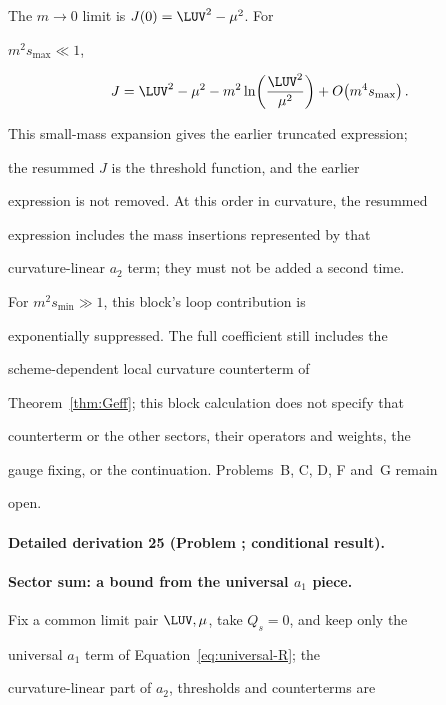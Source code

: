 The \(m\to0\) limit is \(J(0)=\LUV^2-\mu^2\). For

\(m^2s_{\max}\ll1\),

\[

J=\LUV^2-\mu^2

 -m^2\ln\!\left(\frac{\LUV^2}{\mu^2}\right)

 +O\!\left(m^4s_{\max}\right).

\]

This small-mass expansion gives the earlier truncated expression;

the resummed \(J\) is the threshold function, and the earlier

expression is not removed. At this order in curvature, the resummed

expression includes the mass insertions represented by that

curvature-linear \(a_2\) term; they must not be added a second time.

For \(m^2s_{\min}\gg1\), this block's loop contribution is

exponentially suppressed. The full coefficient still includes the

scheme-dependent local curvature counterterm of

Theorem~\ref{thm:Geff}; this block calculation does not specify that

counterterm or the other sectors, their operators and weights, the

gauge fixing, or the continuation. Problems~B, C, D, F and~G remain

open.

\paragraph{Detailed derivation 25 (Problem ; conditional result).} \label{ref:detail-24} %



\paragraph{Sector sum: a bound from the universal \(a_1\) piece.}

Fix a common limit pair \(\LUV,\mu\), take \(Q_s=0\), and keep only the

universal \(a_1\) term of Equation~\eqref{eq:universal-R}; the

curvature-linear part of \(a_2\), thresholds and counterterms are


